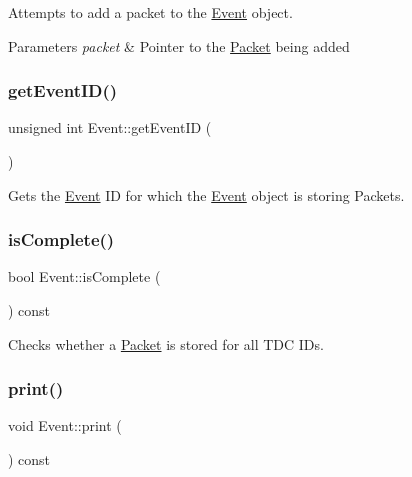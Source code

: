 Attempts to add a packet to the \hyperlink{class_event}{Event} object. 


\begin{DoxyParams}{Parameters}
{\em packet} & Pointer to the \hyperlink{class_packet}{Packet} being added \\
\hline
\end{DoxyParams}
\mbox{\label{class_event_a3f48bec589c70aa0d36fd5cb253ad88c}} 
\subsubsection{\texorpdfstring{get\+Event\+I\+D()}{getEventID()}}
{\footnotesize\ttfamily unsigned int Event\+::get\+Event\+ID (\begin{DoxyParamCaption}{ }\end{DoxyParamCaption})\hspace{0.3cm}{\ttfamily [inline]}}



Gets the \hyperlink{class_event}{Event} ID for which the \hyperlink{class_event}{Event} object is storing Packets. 

\mbox{\label{class_event_a2a00b2c0c579397ac93c834cf987cbd9}} 
\subsubsection{\texorpdfstring{is\+Complete()}{isComplete()}}
{\footnotesize\ttfamily bool Event\+::is\+Complete (\begin{DoxyParamCaption}{ }\end{DoxyParamCaption}) const\hspace{0.3cm}{\ttfamily [inline]}}



Checks whether a \hyperlink{class_packet}{Packet} is stored for all T\+DC I\+Ds. 

\mbox{\label{class_event_ab1b48a39a41a7fc92a25617adcf68aa8}} 
\subsubsection{\texorpdfstring{print()}{print()}}
{\footnotesize\ttfamily void Event\+::print (\begin{DoxyParamCaption}{ }\end{DoxyParamCaption}) const}



